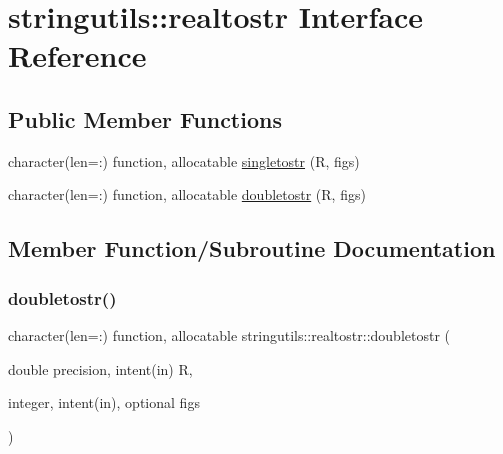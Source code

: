 \hypertarget{interfacestringutils_1_1realtostr}{}\section{stringutils\+:\+:realtostr Interface Reference}
\label{interfacestringutils_1_1realtostr}
\subsection*{Public Member Functions}
\begin{DoxyCompactItemize}
\item 
character(len=\+:) function, allocatable \mbox{\hyperlink{interfacestringutils_1_1realtostr_ace20bfeb98d2e3f2a52674201482da9b}{singletostr}} (R, figs)
\item 
character(len=\+:) function, allocatable \mbox{\hyperlink{interfacestringutils_1_1realtostr_a6f57f162ec2780c6d638d9bf78891847}{doubletostr}} (R, figs)
\end{DoxyCompactItemize}


\subsection{Member Function/\+Subroutine Documentation}
\mbox{\label{interfacestringutils_1_1realtostr_a6f57f162ec2780c6d638d9bf78891847}} 
\subsubsection{\texorpdfstring{doubletostr()}{doubletostr()}}
{\footnotesize\ttfamily character(len=\+:) function, allocatable stringutils\+::realtostr\+::doubletostr (\begin{DoxyParamCaption}\item[{double precision, intent(in)}]{R,  }\item[{integer, intent(in), optional}]{figs }\end{DoxyParamCaption})}

\mbox{\label{interfacestringutils_1_1realtostr_ace20bfeb98d2e3f2a52674201482da9b}} 
